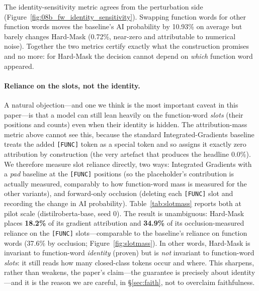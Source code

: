\documentclass[10pt,twocolumn]{article}
\begin{document}
The identity-sensitivity metric agrees from the perturbation side (Figure~\ref{fig:08b_fw_identity_sensitivity}). Swapping function words for other function words moves the baseline's AI probability by 10.93\% on average but barely changes Hard-Mask (0.72\%, near-zero and attributable to numerical noise). Together the two metrics certify exactly what the construction promises and no more: for Hard-Mask the decision cannot depend on \emph{which} function word appeared.

\paragraph{Reliance on the slots, not the identity.} A natural objection---and one we think is the most important caveat in this paper---is that a model can still lean heavily on the function-word \emph{slots} (their positions and counts) even when their identity is hidden. The attribution-mass metric above cannot see this, because the standard Integrated-Gradients baseline treats the added \texttt{[FUNC]} token as a special token and so assigns it exactly zero attribution by construction (the very artefact that produces the headline 0.0\%). We therefore measure slot reliance directly, two ways: Integrated Gradients with a \emph{pad} baseline at the \texttt{[FUNC]} positions (so the placeholder's contribution is actually measured, comparably to how function-word mass is measured for the other variants), and forward-only occlusion (deleting each \texttt{[FUNC]} slot and recording the change in AI probability). Table~\ref{tab:slotmass} reports both at pilot scale (distilroberta-base, seed 0). The result is unambiguous: Hard-Mask places \textbf{18.2\%} of its gradient attribution and \textbf{34.9\%} of its occlusion-measured reliance on the \texttt{[FUNC]} slots---comparable to the baseline's reliance on function words (37.6\% by occlusion; Figure~\ref{fig:slotmass}). In other words, Hard-Mask is invariant to function-word \emph{identity} (proven) but is \emph{not} invariant to function-word \emph{slots}: it still reads how many closed-class tokens occur and where. This sharpens, rather than weakens, the paper's claim---the guarantee is precisely about identity---and it is the reason we are careful, in \S\ref{sec:faith}, not to overclaim faithfulness.
\end{document}
